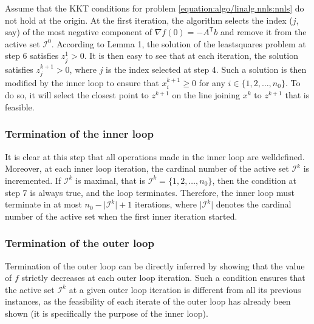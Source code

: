 \documentclass[letterpaper,10pt,english]{sphinxmanual}
\newcommand{\abs}[2][]{#1\lvert#2#1\rvert}
\newcommand{\set}[2][]{#1\{#2#1\}}
\def\T{\ensuremath{\mathsf{T}}}
\begin{document}
\sphinxAtStartPar
Assume that the KKT conditions for problem \eqref{equation:algo/linalg.nnls:nnls} do not hold at the
origin. At the first iteration, the algorithm selects the index
(\(j\), say) of the most negative component of
\(\nabla f(0) = -A^{\T} b\) and remove it from the active set
\(\mathcal{I}^0\). According to Lemma 1, the solution of the least\sphinxhyphen{}squares
problem at step 6 satisfies \(z_j^1 > 0\). It is then easy to see that at
each iteration, the solution satisfies \(z_j^{k + 1} > 0\), where \(j\)
is the index selected at step 4. Such a solution is then modified by the inner
loop to ensure that \(x_i^{k + 1} \ge 0\) for any
\(i \in \set{1, 2, \dots, n_0}\). To do so, it will select the closest
point to \(z^{k + 1}\) on the line joining \(x^k\) to \(z^{k + 1}\)
that is feasible.


\subsubsection{Termination of the inner loop}
\label{\detokenize{algo/linalg.nnls:termination-of-the-inner-loop}}
\sphinxAtStartPar
It is clear at this step that all operations made in the inner loop are
well\sphinxhyphen{}defined. Moreover, at each inner loop iteration, the cardinal number of
the active set \(\mathcal{I}^k\) is incremented. If \(\mathcal{I}^k\)
is maximal, that is \(\mathcal{I}^k = \set{1, 2, \dots, n_0}\), then the
condition at step 7 is always true, and the loop terminates. Therefore, the
inner loop must terminate in at most \(n_0 - \abs{\mathcal{I}^k} + 1\)
iterations, where \(\abs{\mathcal{I}^k}\) denotes the cardinal number of
the active set when the first inner iteration started.


\subsubsection{Termination of the outer loop}
\label{\detokenize{algo/linalg.nnls:termination-of-the-outer-loop}}
\sphinxAtStartPar
Termination of the outer loop can be directly inferred by showing that the
value of \(f\) strictly decreases at each outer loop iteration. Such a
condition ensures that the active set \(\mathcal{I}^k\) at a given outer
loop iteration is different from all its previous instances, as the feasibility
of each iterate of the outer loop has already been shown (it is specifically
the purpose of the inner loop).
\end{document}
